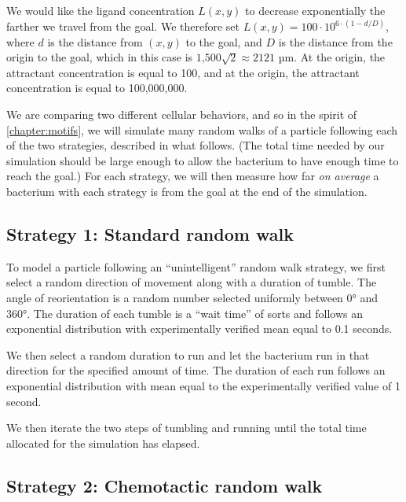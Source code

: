 We would like the ligand concentration $L(x,y)$ to decrease exponentially the farther we travel from the goal. We therefore set $L(x,y) = 100 \cdot 10^{6 \cdot (1-d/D)}$, where $d$ is the distance from $(x, y)$ to the goal, and $D$ is the distance from the origin to the goal, which in this case is $\text{1,500}\sqrt{2} \approx 2121$ µm. At the origin, the attractant concentration is equal to 100, and at the origin, the attractant concentration is equal to 100,000,000.  \\

\begin{qbox}\end{qbox}

We are comparing two different cellular behaviors, and so in the spirit of \autoref{chapter:motifs}, we will simulate many random walks of a particle following each of the two strategies, described in what follows. (The total time needed by our simulation should be large enough to allow the bacterium to have enough time to reach the goal.) For each strategy, we will then measure how far \textit{on average} a bacterium with each strategy is from the goal at the end of the simulation.

\FloatBarrier
{}
\subsection{Strategy 1: Standard random walk}

To model a particle following an ``unintelligent'' random walk strategy, we first select a random direction of movement along with a duration of tumble. The angle of reorientation is a random number selected uniformly between 0° and 360°. The duration of each tumble is a ``wait time'' of sorts and follows an exponential distribution with experimentally verified mean equal to 0.1 seconds.

We then select a random duration to run and let the bacterium run in that direction for the specified amount of time.  The duration of each run follows an exponential distribution with mean equal to the experimentally verified value of 1 second.

We then iterate the two steps of tumbling and running until the total time allocated for the simulation has elapsed.

\FloatBarrier
{}
\subsection{Strategy 2: Chemotactic random walk}

